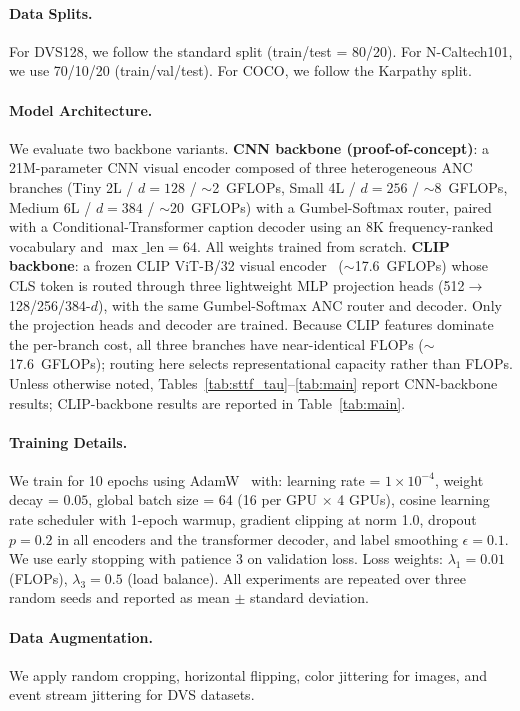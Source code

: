 \documentclass{article}
\begin{document}
\paragraph{Data Splits.}
For DVS128, we follow the standard split (train/test = 80/20).
For N-Caltech101, we use 70/10/20 (train/val/test).
For COCO, we follow the Karpathy split.

\paragraph{Model Architecture.}
We evaluate two backbone variants.
\textbf{CNN backbone (proof-of-concept)}: a 21M-parameter CNN visual encoder composed of three heterogeneous ANC branches (Tiny 2L / $d{=}128$ / $\sim$2~GFLOPs, Small 4L / $d{=}256$ / $\sim$8~GFLOPs, Medium 6L / $d{=}384$ / $\sim$20~GFLOPs) with a Gumbel-Softmax router, paired with a Conditional-Transformer caption decoder using an 8K frequency-ranked vocabulary and $\max\_{\text{len}}{=}64$. All weights trained from scratch.
\textbf{CLIP backbone}: a frozen CLIP ViT-B/32 visual encoder~\cite{radford2021clip} ($\sim$17.6~GFLOPs) whose CLS token is routed through three lightweight MLP projection heads (512$\to$128/256/384-$d$), with the same Gumbel-Softmax ANC router and decoder. Only the projection heads and decoder are trained. Because CLIP features dominate the per-branch cost, all three branches have near-identical FLOPs ($\sim$17.6~GFLOPs); routing here selects representational capacity rather than FLOPs. Unless otherwise noted, Tables~\ref{tab:sttf_tau}--\ref{tab:main} report CNN-backbone results; CLIP-backbone results are reported in Table~\ref{tab:main}.

\paragraph{Training Details.}
We train for 10 epochs using AdamW~\cite{loshchilov2019adamw} with:
learning rate = $1 \times 10^{-4}$,
weight decay = $0.05$,
global batch size = 64 (16 per GPU $\times$ 4 GPUs),
cosine learning rate scheduler with 1-epoch warmup,
gradient clipping at norm 1.0,
dropout $p=0.2$ in all encoders and the transformer decoder,
and label smoothing $\epsilon=0.1$.
We use early stopping with patience 3 on validation loss.
Loss weights: $\lambda_1=0.01$ (FLOPs), $\lambda_3=0.5$ (load balance).
All experiments are repeated over three random seeds and reported as mean $\pm$ standard deviation.

\paragraph{Data Augmentation.}
We apply random cropping, horizontal flipping, color jittering for images,
and event stream jittering for DVS datasets.
\end{document}
